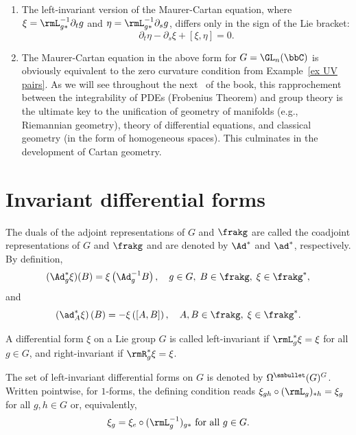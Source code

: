 \begin{rem}
    \begin{enumerate}
        \item The left-invariant version of the Maurer-Cartan equation, where $\xi=\rmL_{g\ast}^{-1}\partial_t g$ and $\eta =\rmL_{g\ast}^{-1}\partial_s g$, differs only in the sign of the Lie bracket: 
        \[\partial_t\eta-\partial_s\xi+[\xi,\eta]=0.\label{eq Maurer-Cartan left xi eta}\]
        \item The Maurer-Cartan equation in the above form for $G=\GL_n(\bbC)$ is obviously equivalent to the zero curvature condition from Example~\ref{ex UV pairs}. As we will see throughout the next \partt\ of the book, this rapprochement between the integrability of PDEs (Frobenius Theorem) and group theory is the ultimate key to the unification of geometry of manifolds (e.g., Riemannian geometry), theory of differential equations, and classical geometry (in the form of homogeneous spaces). This culminates in the development of Cartan geometry.
    \end{enumerate}
\end{rem}










\section{Invariant differential forms}\label{subsec: invariant diff forms}

\begin{defn}
    The duals of the adjoint representations of $G$ and $\frakg$ are called the coadjoint representations of $G$ and $\frakg$ and are denoted by $\Ad^\ast$ and $\ad^\ast$, respectively. By definition,
    \[(\Ad^\ast_g \xi)(B)=\xi\left(\Ad_g^{-1}B\right),\quad  g\in G,\;B\in\frakg,\;\xi\in\frakg^\ast,\]
    and 
    \[\left(\ad_A^\ast \xi\right)(B)=-\xi\left([A,B]\right),\quad A,B\in\frakg,\;\xi\in\frakg^\ast.\]
\end{defn}


\begin{defn}
    A differential form $\xi$ on a Lie group $G$ is called left-invariant if $\rmL_g^\ast\xi =\xi $ for all $g\in G$, and right-invariant if $\rmR_g^\ast\xi=\xi$.

    The set of left-invariant differential forms on $G$ is denoted by $\Omega^{\smbullet }(G)^G$. Written pointwise, for $1$-forms, the defining condition reads $\xi_{gh}\circ (\rmL_g)_{\ast h}=\xi_g$ for all $g,h\in G$ or, equivalently,
    \[\xi_g=\xi_e\circ (\rmL_{g}^{-1})_{g\ast}\text{ for all }g\in G.\label{eq 5.5.1 RS1}\]
\end{defn}

